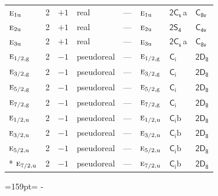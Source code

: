 \documentclass[10pt,a4paper]{article}
\makeatletter
\def\grouprule#1#2{\noalign{\marks\LTgroupmarks{\the\belowrulesep}\nobreak\vskip#1%
  \vskip\aboverulesep}\multispan\LT@cols\unskip{\leaders\hrule\@height#2\hfill\kern\z@}\cr
  \noalign{\penalty\LTrulebreak\vskip\belowrulesep\global\@lastruleclass\z@}}
\newcommand{\needspace}[1]{\par\penalty-100\begingroup\dimen0=#1\relax\dimen2=\pagegoal
  \advance\dimen2-\pagetotal\ifdim\dimen0>\dimen2\relax\ifdim\dimen2>0pt\vfil\break\fi\fi
  \endgroup}
\numberwithin{equation}{section}
\newcommand{\grp}[1]{\mathsf{#1}}
\newcommand{\irr}[1]{\text{\normalfont\scshape #1}}
\newcommand{\ptag}[1]{\mathrm{#1}}
\newcommand{\clsletter}[1]{\,{\scriptsize\color{black!55}#1}}
\newcommand{\secondclass}{\mathrm{b}}
\makeatother
\begin{document}
{\begin{longtable}{@{}lrrlllll@{}}
$\irr{e}_{1\ptag{u}}$ & 2 & $+1$ & real & --- & $\irr{e}_{1\ptag{u}}$ & \href{2C1v.pdf}{$\grp{2C_{s}}$}\clsletter{a} & \href{../../../rotation/data/pdf/C8v.pdf}{$\grp{C_{8v}}$}\\
$\irr{e}_{2\ptag{u}}$ & 2 & $+1$ & real & --- & $\irr{e}_{2\ptag{u}}$ & \href{2S4.pdf}{$\grp{2S_{4}}$} & \href{../../../rotation/data/pdf/C4v.pdf}{$\grp{C_{4v}}$}\\
$\irr{e}_{3\ptag{u}}$ & 2 & $+1$ & real & --- & $\irr{e}_{3\ptag{u}}$ & \href{2C1v.pdf}{$\grp{2C_{s}}$}\clsletter{a} & \href{../../../rotation/data/pdf/C8v.pdf}{$\grp{C_{8v}}$}\\
\grouprule{0pt}{\lightrulewidth}
$\irr{e}_{1/2,\ptag{g}}$ & 2 & $-1$ & pseudoreal & --- & $\irr{e}_{1/2,\ptag{g}}$ & \href{S2.pdf}{$\grp{C_{i}}$} & \href{2D8.pdf}{$\grp{2D_{8}}$}\\
$\irr{e}_{3/2,\ptag{g}}$ & 2 & $-1$ & pseudoreal & --- & $\irr{e}_{3/2,\ptag{g}}$ & \href{S2.pdf}{$\grp{C_{i}}$} & \href{2D8.pdf}{$\grp{2D_{8}}$}\\
$\irr{e}_{5/2,\ptag{g}}$ & 2 & $-1$ & pseudoreal & --- & $\irr{e}_{5/2,\ptag{g}}$ & \href{S2.pdf}{$\grp{C_{i}}$} & \href{2D8.pdf}{$\grp{2D_{8}}$}\\
$\irr{e}_{7/2,\ptag{g}}$ & 2 & $-1$ & pseudoreal & --- & $\irr{e}_{7/2,\ptag{g}}$ & \href{S2.pdf}{$\grp{C_{i}}$} & \href{2D8.pdf}{$\grp{2D_{8}}$}\\
$\irr{e}_{1/2,\ptag{u}}$ & 2 & $-1$ & pseudoreal & --- & $\irr{e}_{1/2,\ptag{u}}$ & \href{S2b.pdf}{$\grp{C_{i}}\secondclass$} & \href{2D8.pdf}{$\grp{2D_{8}}$}\\
$\irr{e}_{3/2,\ptag{u}}$ & 2 & $-1$ & pseudoreal & --- & $\irr{e}_{3/2,\ptag{u}}$ & \href{S2b.pdf}{$\grp{C_{i}}\secondclass$} & \href{2D8.pdf}{$\grp{2D_{8}}$}\\
$\irr{e}_{5/2,\ptag{u}}$ & 2 & $-1$ & pseudoreal & --- & $\irr{e}_{5/2,\ptag{u}}$ & \href{S2b.pdf}{$\grp{C_{i}}\secondclass$} & \href{2D8.pdf}{$\grp{2D_{8}}$}\\*
$\irr{e}_{7/2,\ptag{u}}$ & 2 & $-1$ & pseudoreal & --- & $\irr{e}_{7/2,\ptag{u}}$ & \href{S2b.pdf}{$\grp{C_{i}}\secondclass$} & \href{2D8.pdf}{$\grp{2D_{8}}$}\\
\bottomrule\end{longtable}}
\needspace{159pt}
\end{document}
